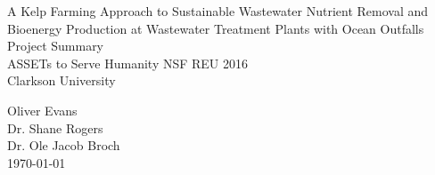 \documentclass[10pt]{article}
\begin{document}
\null

\thispagestyle{empty}
\addtocounter{page}{-1}

\begin{center}
    \begin{sffamily}
	\begin{bfseries}
	    \null
	    \vfill
	    \Huge{A Kelp Farming Approach to Sustainable Wastewater Nutrient Removal and Bioenergy Production at Wastewater Treatment Plants with Ocean Outfalls} \\

	    \vspace{20pt}
	    \LARGE{Project Summary} \\
	    \vspace{20pt}
		\Large{ASSETs to Serve Humanity NSF REU 2016} \\
		\Large{Clarkson University} \\
	    \vspace{20pt}
    \begin{Large}
		Oliver Evans \\
		Dr. Shane Rogers \\
		Dr. Ole Jacob Broch \\
	\vspace{20pt}
	\today \\
    \end{Large}
	\end{bfseries}
    \end{sffamily}
    \vspace{30pt}

    \null
    \vfill
    \vfill
    \null
\end{center}
\pagebreak


\renewcommand{\arraystretch}{1.5}
\end{document}
